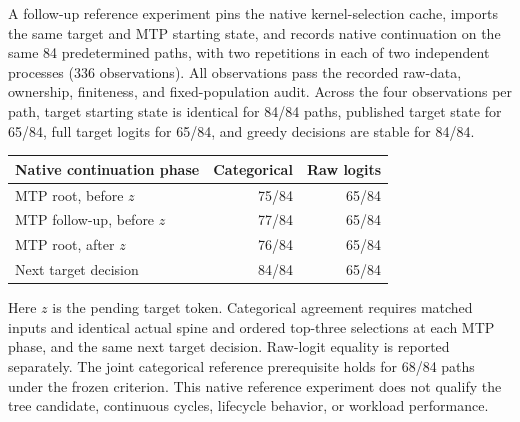 A follow-up reference experiment pins the native kernel-selection cache,
imports the same target and MTP starting state, and
records native continuation on the same 84 predetermined paths, with two repetitions
in each of two independent processes (336 observations). All observations pass
the recorded raw-data, ownership, finiteness, and fixed-population audit.
Across the four observations per path, target starting state is identical for
84/84 paths, published target state for 65/84,
full target logits for 65/84, and greedy decisions are
stable for 84/84.

\begin{center}
\begin{tabular}{lrr}
\toprule
Native continuation phase & Categorical & Raw logits \\
\midrule
MTP root, before $z$ & 75/84 & 65/84 \\
MTP follow-up, before $z$ & 77/84 & 65/84 \\
MTP root, after $z$ & 76/84 & 65/84 \\
Next target decision & 84/84 & 65/84 \\
\bottomrule
\end{tabular}
\end{center}
Here $z$ is the pending target token. Categorical agreement requires matched inputs and identical actual spine and
ordered top-three selections at each MTP phase, and the same next target decision.
Raw-logit equality is reported separately. The joint categorical reference
prerequisite holds for 68/84 paths under the frozen
criterion. This native reference experiment does not qualify the tree candidate,
continuous cycles, lifecycle behavior, or workload performance.

